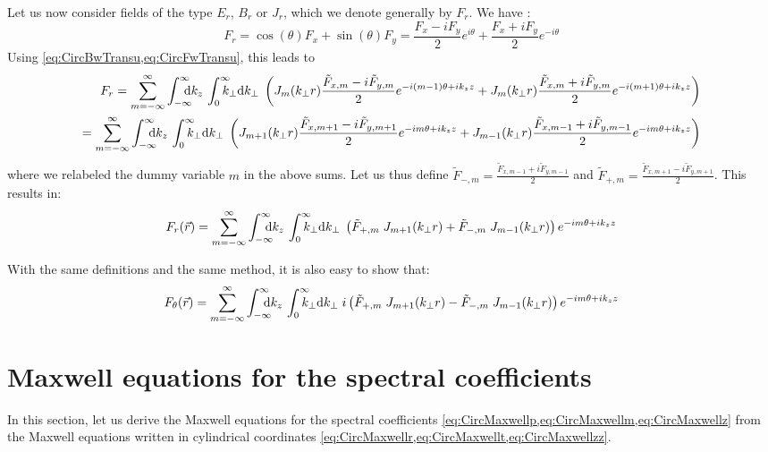 Let us now consider fields of the type $E_r$, $B_r$ or $J_r$, which we
denote generally by $F_r$. We have :
\[ F_r = \cos(\theta) F_x + \sin(\theta) F_y 
= \frac{F_x - iF_y}{2}e^{i\theta} + \frac{F_x +
  iF_y}{2}e^{-i\theta} \] 
Using \cref{eq:CircBwTransu,eq:CircFwTransu}, this leads to
\begin{align} 
F_r =  \sum_{m=-\infty}^{\infty} \Integ{k_z}\,\RInteg{k_\perp }\;
\left(  J_m(k_\perp r) \frac{\tilde{F}_{x,m} -
    i\tilde{F}_{y,m}}{2}e^{-i(m-1)\theta +ik_z z} + J_m(k_\perp r)
  \frac{\tilde{F}_{x,m} +   i\tilde{F}_{y,m}}{2}e^{-i(m+1)\theta +
    ik_z z} \right) \\
= \sum_{m=-\infty}^{\infty} \Integ{k_z}\,\RInteg{k_\perp }\;
\left(  J_{m+1}(k_\perp r) \frac{\tilde{F}_{x,m+1} -
    i\tilde{F}_{y,m+1}}{2}e^{-im\theta +ik_z z} + J_{m-1}(k_\perp r)
  \frac{\tilde{F}_{x,m-1} +   i\tilde{F}_{y,m-1}}{2}e^{-im\theta +
    ik_z z} \right) 
\end{align}
where we relabeled the dummy variable $m$ in the above sums. Let us
thus define $\tilde{F}_{-,m} = \frac{\tilde{F}_{x,m-1} +
    i\tilde{F}_{y,m-1}}{2}$ and $\tilde{F}_{+,m} = \frac{\tilde{F}_{x,m+1} -
    i\tilde{F}_{y,m+1}}{2}$. This results in:
\begin{equation} 
F_r(\vec{r}) = \sum_{m=-\infty}^{\infty} \Integ{k_z}\,\RInteg{k_\perp }\;
\left( \tilde{F}_{+,m}\; J_{m+1}(k_\perp r) +\tilde{F}_{-,m}\; J_{m-1}(k_\perp r)
\right)  e^{-im\theta +ik_z z}
\end{equation}

With the same definitions and the same method, it is also easy to show that:
\begin{equation} 
F_\theta(\vec{r}) = \sum_{m=-\infty}^{\infty} \Integ{k_z}\,\RInteg{k_\perp }\;
i\left( \tilde{F}_{+,m}\; J_{m+1}(k_\perp r) - \tilde{F}_{-,m}\; J_{m-1}(k_\perp r)
\right)  e^{-im\theta +ik_z z}
\end{equation}

\section{Maxwell equations for the spectral coefficients}
\label{sec:SpectMaxwell}

In this section, let us derive the Maxwell equations for the spectral
coefficients \cref{eq:CircMaxwellp,eq:CircMaxwellm,eq:CircMaxwellz}
from the Maxwell equations written in cylindrical coordinates \cref{eq:CircMaxwellr,eq:CircMaxwellt,eq:CircMaxwellzz}.


